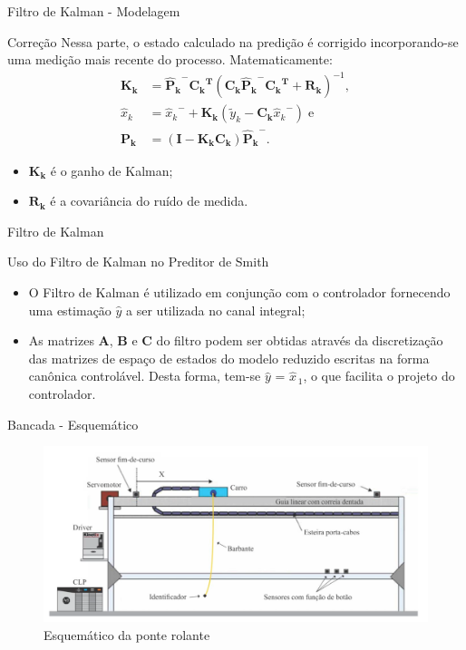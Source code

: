 \documentclass[10pt]{beamer}
\begin{document}
\begin{frame}[fragile]{Filtro de Kalman - Modelagem}
\begin{block}{Correção}
Nessa parte, o estado calculado na predição é corrigido incorporando-se uma medição mais recente do processo. Matematicamente:
\begin{align}
\label{KalmanEq6} \mathbf{K_k} &= \mathbf{{\hat{P}_{k}}^{-}}\mathbf{{C_k}^T} {\left( \mathbf{C_k}\mathbf{{\hat{P}_{k}}^{-}}\mathbf{{C_k}^T} + \mathbf{R_k} \right)}^{-1}, \\
	\label{KalmanEq7} \hat{x}_k &= {\hat{x}_{k}}^{-} + \mathbf{K_k} \left( \tilde{y}_k - \mathbf{C_k}{\hat{x}_{k}}^{-} \right)\;\mathrm{e} \\
	\label{KalmanEq8} \mathbf{P_k} &= \left( \mathbf{I} - \mathbf{K_k}\mathbf{C_k}\right)\mathbf{{\hat{P}_{k}}^{-}}.
\end{align}
\begin{itemize}
\item $\mathbf{K_k}$ é o ganho de Kalman;
\item $\mathbf{R_k}$ é a covariância do ruído de medida.
\end{itemize}
\end{block}
\end{frame}

\begin{frame}[fragile]{Filtro de Kalman}
\begin{block}{Uso do Filtro de Kalman no Preditor de Smith}
\begin{itemize}
\item O Filtro de Kalman é utilizado em conjunção com o controlador fornecendo uma estimação $\hat{y}$ a ser utilizada no canal integral;
\item As matrizes $\mathbf{A}$, $\mathbf{B}$ e $\mathbf{C}$ do filtro podem ser obtidas através da discretização das matrizes de espaço de estados do modelo reduzido escritas na forma canônica controlável. Desta forma, tem-se $\hat{y}$ = $\hat{x}_{\,1}$, o que facilita o projeto do controlador.
\end{itemize}
\end{block}
\end{frame}

\begin{frame}[fragile]{Bancada - Esquemático}
\begin{figure}[!ht]
	\centering
	\includegraphics[width=.9\linewidth]{figures/fundamentos/bancadaEsquematico}
	\caption{Esquemático da ponte rolante \cite{redytton}}
	\label{bancadaesq}
\end{figure}
\end{frame}
\end{document}

